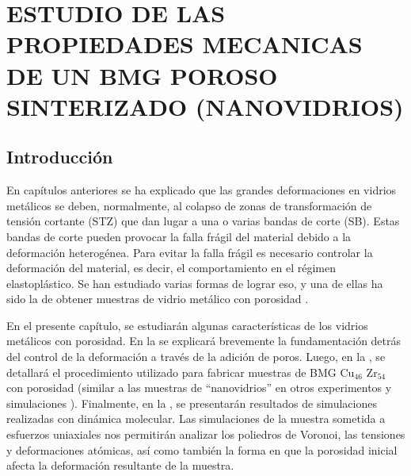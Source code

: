 
\chapter{ESTUDIO DE LAS PROPIEDADES MECANICAS DE UN BMG POROSO SINTERIZADO (NANOVIDRIOS)} %

\label{C5} %




\section{Introducción}
\label{S5_1}

En capítulos anteriores se ha explicado que las grandes deformaciones en vidrios metálicos se deben, normalmente,
al colapso de zonas de transformación de tensión cortante (STZ) que dan lugar a una o varias bandas de corte (SB).
Estas bandas de corte pueden provocar la falla frágil del material debido a la deformación heterogénea.
Para evitar la falla frágil es necesario controlar la deformación del material, es decir, el comportamiento en el régimen elastoplástico.
Se han estudiado varias formas de lograr eso, y una de ellas ha sido la de obtener muestras de vidrio metálico con porosidad 
\citep{guan13,wang10,schuh07,liontas14}.

En el presente capítulo, se estudiarán algunas características de los vidrios metálicos con porosidad. En la  se explicará
brevemente la fundamentación detrás del control de la deformación a través de la adición de poros.
Luego, en la , se detallará el procedimiento utilizado para fabricar muestras de BMG Cu$_{46}$ Zr$_{54}$ con porosidad
(similar a las muestras de ``nanovidrios'' en otros experimentos y simulaciones \citep{adibi13,albe13}). Finalmente, en la ,
se presentarán resultados de simulaciones
realizadas con dinámica molecular. Las simulaciones de la muestra sometida a esfuerzos uniaxiales nos permitirán analizar los poliedros
de Voronoi, las tensiones y deformaciones atómicas, así como también la forma en que la porosidad inicial afecta la deformación resultante
de la muestra.

